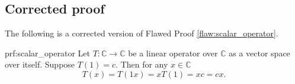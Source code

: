 \clearpage
\subsection{Corrected proof}

The following is a corrected version of Flawed Proof \ref{flaw:scalar_operator}. %

\begin{prf}{prf:scalar_operator} %
Let $T: \mathbb{C} \to \mathbb{C}$ be a linear operator over $\mathbb{C}$ as a vector space over itself. Suppose $T(1) = c$. Then for any $x \in \mathbb{C}$
$$T(x) = T(1x) = xT(1) = xc = cx. $$

\end{prf} 